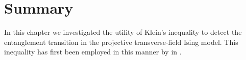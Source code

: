 \section{Summary}
In this chapter we investigated the utility of Klein's inequality to detect the
entanglement transition in the projective transverse-field Ising model. This
inequality has first been employed in this manner by
\citeauthor{garrattProbingPostmeasurementEntanglement2023} in
\cite{garrattProbingPostmeasurementEntanglement2023}. 

